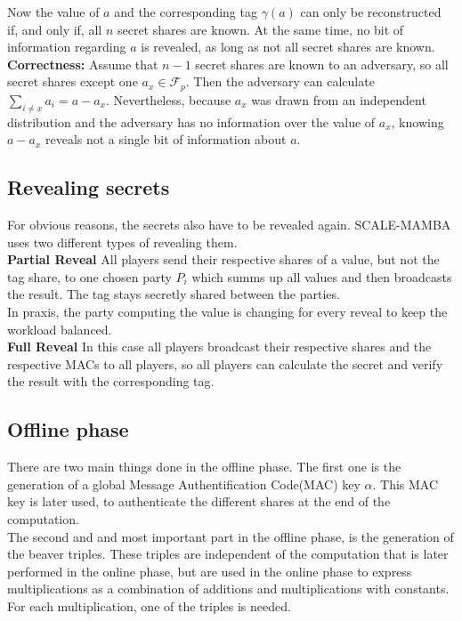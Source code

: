 \documentclass[english,runningheads,a4paper]{llncs}[2018/03/10]
\begin{document}
Now the value of \(a\) and the corresponding tag \(\gamma(a)\) can only be reconstructed if, and only if, all \(n\) secret shares are known. At the same time, no bit of information regarding \(a\) is revealed, as long as not all secret shares are known.\\
\textbf{Correctness:} Assume that $n-1$ secret shares are known to an adversary, so all secret shares except one $a_x \in \mathcal{F}_p $. Then the adversary can calculate $\sum_{i \neq x} a_i = a-a_x$. Nevertheless, because $a_x$ was drawn from an independent distribution and the adversary has no information over the value of \(a_x\), knowing $a-a_x$ reveals not a single bit of information about $a$.\\


\subsection{Revealing secrets}

For obvious reasons, the secrets also have to be revealed again. SCALE-MAMBA uses two different types of revealing them.\\

\textbf{Partial Reveal}
All players send their respective shares of a value, but not the tag share, to one chosen party \(P_i\) which summs up all values and then broadcasts the result. The tag stays secretly shared between the parties.\\
In praxis, the party computing the value is changing for every reveal to keep the workload balanced.\\
\textbf{Full Reveal}
In this case all players broadcast their respective shares and the respective MACs to all players, so all players can calculate the secret and verify the result with the corresponding tag.\\


\subsection{Offline phase}

There are two main things done in the offline phase. The first one is the generation of a global Message Authentification Code(MAC) key $\alpha$. This MAC key is later used, to authenticate the different shares at the end of the computation.\\
The second and and most important part in the offline phase, is the generation of the beaver triples. These triples  are independent of the computation that is later performed in the online phase, but are used in the online phase to express multiplications as a combination of additions and multiplications with constants. For each multiplication, one of the triples is needed.
\end{document}
